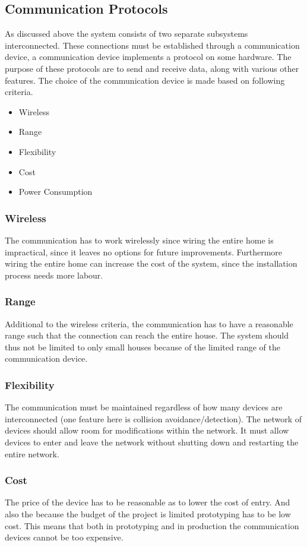 \subsection{Communication Protocols}
\label{sub:Communicationprotocols}
As discussed above the system consists of two separate subsystems interconnected. These connections must be established through a communication device, a communication device implements a protocol on some hardware. The purpose of these protocols are to send and receive data, along with various other features. The choice of the communication device is made based on following criteria.
\begin{itemize}
  \item Wireless
  \item Range
  \item Flexibility
  \item Cost
  \item Power Consumption
\end{itemize}

\subsubsection{Wireless}
The communication has to work wirelessly since wiring the entire home is impractical, since it leaves no options for future improvements. Furthermore wiring the entire home can increase the cost of the system, since the installation process needs more labour.

\subsubsection{Range}
Additional to the wireless criteria, the communication has to have a reasonable range such that the connection can reach the entire house. The system should thus not be limited to only small houses because of the limited range of the communication device.

\subsubsection{Flexibility}
The communication must be maintained regardless of how many devices are interconnected (one feature here is collision avoidance/detection). The network of devices should allow room for modifications within the network. It must allow devices to enter and leave the network without shutting down and restarting the entire network.

\subsubsection{Cost}
The price of the device has to be reasonable as to lower the cost of entry. And also the because the budget of the project is limited prototyping has to be low cost. This means that both in prototyping and in production the communication devices cannot be too expensive.

